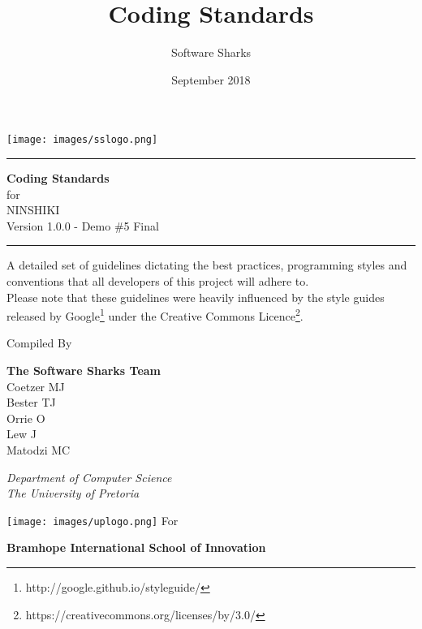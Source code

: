 \documentclass[a4paper, 11pt]{article}
\title{Coding Standards}
\author{Software Sharks}
\date{September 2018}
\newcommand{\systemTitle}{NINSHIKI}
\begin{document}
\begin{titlepage}
\texttt{[image: images/sslogo.png]}
	\centering
	
    \scshape
    \sffamily
	
	\vspace*{\baselineskip}
	
	\rule{\textwidth}{3pt}
	
	\vspace{0.75\baselineskip}
	
	\textrm{\LARGE \textbf{Coding Standards} \\ for\\ \systemTitle{}\\ \small Version 1.0.0 - Demo \#5 Final\\}
	
	\vspace{0.75\baselineskip}
	
	\rule{\textwidth}{3pt} 
	
	\vspace{2\baselineskip}
	
	A detailed set of guidelines dictating the best practices, programming styles and conventions that all developers of this project will adhere to. \\ 
    \footnotesize Please note that these guidelines were heavily influenced by the style guides released by Google\footnote{http://google.github.io/styleguide/} under the Creative Commons Licence\footnote{https://creativecommons.org/licenses/by/3.0/}.
	
	\vspace*{3\baselineskip}
	
	Compiled By
	
	\vspace{0.5\baselineskip}
	
    \textsf{\large
    \textrm{\textbf{The Software Sharks Team}} \\
    \small 
    Coetzer MJ \\
    Bester TJ \\
    Orrie O \\
    Lew J \\
    Matodzi MC \\
    } 
	
	\vspace{0.5\baselineskip}
	
	\textit{ Department of Computer Science \\ The University of Pretoria}
	
    \vfill
    \texttt{[image: images/uplogo.png]}
    \vfill
    For
	
	\vspace{0.5\baselineskip}
	
    \textsf{\large
    \textrm{\textbf{Bramhope International School of Innovation}} \\
    } 

\end{titlepage}
\end{document}
